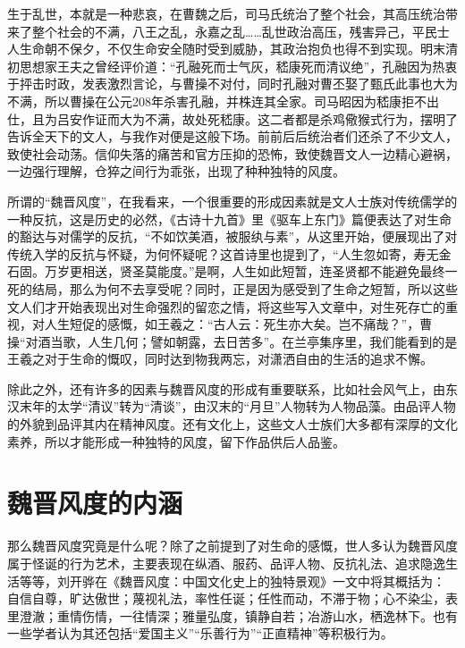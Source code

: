 \documentclass[12pt,a4paper]{ctexart}
\newcommand{\supercite}[1]{\textsuperscript{\cite{#1}}}
\begin{document}
生于乱世，本就是一种悲哀，在曹魏之后，司马氏统治了整个社会，其高压统治带来了整个社会的不满，八王之乱，永嘉之乱……乱世政治高压，残害异己，平民士人生命朝不保夕，不仅生命安全随时受到威胁，其政治抱负也得不到实现。明末清初思想家王夫之曾经评价道：“孔融死而士气灰，嵇康死而清议绝”，孔融因为热衷于抨击时政，发表激烈言论，与曹操不对付，同时孔融对曹丕娶了甄氏此事也大为不满，所以曹操在公元208年杀害孔融，并株连其全家。司马昭因为嵇康拒不出仕，且为吕安作证而大为不满，故处死嵇康。这二者都是杀鸡儆猴式行为，摆明了告诉全天下的文人，与我作对便是这般下场。前前后后统治者们还杀了不少文人，致使社会动荡。信仰失落的痛苦和官方压抑的恐怖，致使魏晋文人一边精心避祸，一边强行理解，仓猝之间行为乖张，出现了种种独特的风度。

所谓的“魏晋风度”，在我看来，一个很重要的形成因素就是文人士族对传统儒学的一种反抗，这是历史的必然，《古诗十九首》里《驱车上东门》篇便表达了对生命的豁达与对儒学的反抗，“不如饮美酒，被服纨与素”，从这里开始，便展现出了对传统入学的反抗与怀疑，为何怀疑呢？这首诗里也提到了，“人生忽如寄，寿无金石固。万岁更相送，贤圣莫能度。”是啊，人生如此短暂，连圣贤都不能避免最终一死的结局，那么为何不去享受呢？同时，正是因为感受到了生命之短暂，所以这些文人们才开始表现出对生命强烈的留恋之情，将这些写入文章中，对生死存亡的重视，对人生短促的感慨，如王羲之：“古人云：死生亦大矣。岂不痛哉？”，曹操“对酒当歌，人生几何；譬如朝露，去日苦多”。在兰亭集序里，我们能看到的是王羲之对于生命的慨叹，同时达到物我两忘，对潇洒自由的生活的追求不懈\supercite{3}。

除此之外，还有许多的因素与魏晋风度的形成有重要联系，比如社会风气上，由东汉末年的太学“清议”转为“清谈”，由汉末的“月旦”人物转为人物品藻。由品评人物的外貌到品评其内在精神风度。还有文化上，这些文人士族们大多都有深厚的文化素养，所以才能形成一种独特的风度，留下作品供后人品鉴。
\section{魏晋风度的内涵}
那么魏晋风度究竟是什么呢？除了之前提到了对生命的感慨，世人多认为魏晋风度属于怪诞的行为艺术，主要表现在纵酒、服药、品评人物、反抗礼法、追求隐逸生活等等，刘开骅在《魏晋风度：中国文化史上的独特景观》一文中将其概括为： 自信自尊，旷达傲世；蔑视礼法，率性任诞；任性而动，不滞于物；心不染尘，表里澄澈；重情伤情，一往情深；雅量弘度，镇静自若；冶游山水，栖逸林下\supercite{4}。也有一些学者认为其还包括“爱国主义”“乐善行为”“正直精神”等积极行为\supercite{5}。
\end{document}

